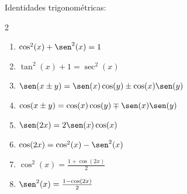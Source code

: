 \documentclass{article}
\begin{document}

{\large Identidades trigonométricas:}
\begin{multicols}{2}
  \begin{enumerate}
    \item $\cos^2(x)+\sen^2(x)=1$
    \item $\tan^2(x)+1=\sec^2(x)$
    \item $\sen(x\pm y)=\sen(x)\cos(y)\pm\cos(x)\sen(y)$
    \item $\cos(x\pm y)=\cos(x)\cos(y)\mp\sen(x)\sen(y)$
    \item $\sen(2x)=2\sen(x)\cos(x)$
    \item $\cos(2x)=\cos^2(x)-\sen^2(x)$
    \item $\cos^2(x)=\frac{1+\cos(2x)}{2}$
    \item $\sen^2(x)=\frac{1-\cos(2x)}{2}$
  \end{enumerate}
\end{multicols}
\vspace{2mm}
\end{document}
